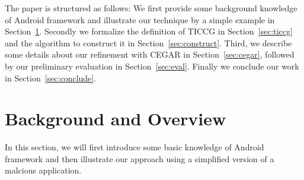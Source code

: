 \documentclass{article}
\begin{document}
The paper is structured as follows: We first provide some background knowledge of
Android framework and illustrate our technique by a simple example in Section~\ref{sec:overview}.
Secondly we formalize the definition of TICCG in Section~\ref{sec:ticcg} and 
the algorithm to construct it in Section~\ref{sec:construct}. Third, 
we describe some details about our refinement with CEGAR in Section~\ref{sec:cegar}, 
followed by our preliminary evaluation in Section~\ref{sec:eval}.
Finally we conclude our work in Section~\ref{sec:conclude}.

\section{Background and Overview}
\label{sec:overview}
In this section, we will first introduce some basic knowledge of Android framework 
and then illustrate our approach using a simplified version of a malcious application.
\end{document}
